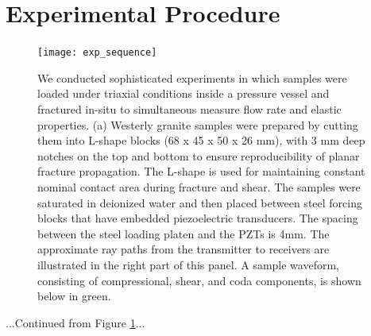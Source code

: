 \documentclass[letterpaper,10pt]{article}
\begin{document}
\pagebreak


\section{Experimental Procedure}

\begin{figure}[ht]
	\centering
	\texttt{[image: exp\_sequence]}
	\caption[]{We conducted sophisticated experiments in which samples were loaded under triaxial conditions inside a pressure vessel and fractured in-situ to simultaneous measure flow rate and elastic properties. (a) Westerly granite samples were prepared by cutting them into L-shape blocks (68 x 45 x 50 x 26 mm), with 3 mm deep notches on the top and bottom to ensure reproducibility of planar fracture propagation. The L-shape is used for maintaining constant nominal contact area during fracture and shear. The samples were saturated in deionized water and then placed between steel forcing blocks that have embedded piezoelectric transducers. The spacing between the steel loading platen and the PZTs is 4mm. The approximate ray paths from the transmitter to receivers are illustrated in the right part of this panel. A sample waveform, consisting of compressional, shear, and coda components, is shown below in green.
	}
	\label{fig:exp_seq}
\end{figure}

\newpage

...Continued from Figure \ref{fig:exp_seq}...
\end{document}

